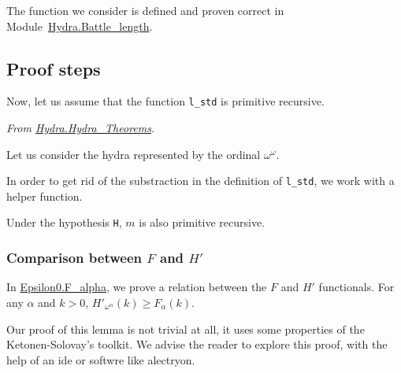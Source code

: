 The function we consider is defined and proven correct in
Module~\href{../theories/html/hydras.Hydra.Battle_length.html}{Hydra.Battle\_length}.



\subsection{Proof steps}

Now, let us assume that the function \texttt{l\_std} is primitive recursive.


\emph{From \href{../theories/html/hydras.Hydra.Hydra_Theorems.html}{Hydra.Hydra\_Theorems}}.



Let us consider the hydra represented by the ordinal $\omega^\omega$.




In order to get rid of the substraction in the definition of \texttt{l\_std}, we work with a helper function.



Under the hypothesis \texttt{H}, $m$ is also primitive recursive.




\subsubsection{Comparison between $F$ and $H'$}

In \href{../theories/html/hydras.Epsilon0.F_alpha.html}{Epsilon0.F\_alpha}, we prove a relation between the $F$ and $H'$ functionals. For any $\alpha$ and $k>0$,
$H'_{\omega^\alpha}(k)\geq F_\alpha(k)$.




Our proof of this lemma is not trivial at all, it uses some properties of the Ketonen-Solovay's toolkit. We advise the reader to explore this proof, with the help of an ide or softwre like alectryon.


